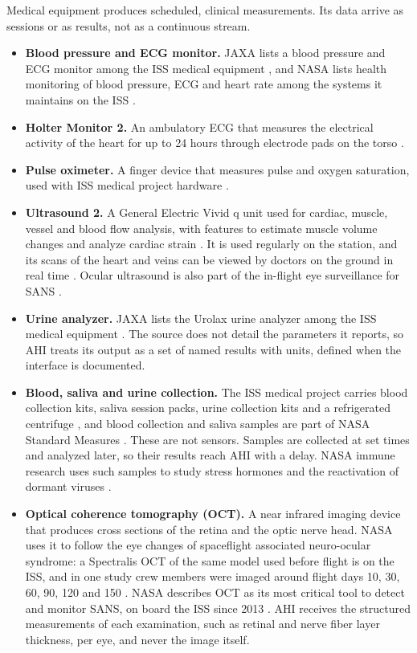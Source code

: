 Medical equipment produces scheduled, clinical measurements. Its data arrive as sessions or as results, not as a continuous stream.

\begin{itemize}
\item \textbf{Blood pressure and ECG monitor.} JAXA lists a blood pressure and ECG monitor among the ISS medical equipment \cite{jaxa_medops_system}, and NASA lists health monitoring of blood pressure, ECG and heart rate among the systems it maintains on the ISS \cite{nasa_jsc_exercise_countermeasures}.
\item \textbf{Holter Monitor 2.} An ambulatory ECG that measures the electrical activity of the heart for up to 24 hours through electrode pads on the torso \cite{nasa_issmp_hardware}.
\item \textbf{Pulse oximeter.} A finger device that measures pulse and oxygen saturation, used with ISS medical project hardware \cite{nasa_issmp_hardware}.
\item \textbf{Ultrasound 2.} A General Electric Vivid q unit used for cardiac, muscle, vessel and blood flow analysis, with features to estimate muscle volume changes and analyze cardiac strain \cite{nasa_issmp_hardware}. It is used regularly on the station, and its scans of the heart and veins can be viewed by doctors on the ground in real time \cite{nasa_ultrasound_2025}. Ocular ultrasound is also part of the in-flight eye surveillance for SANS \cite{brunstetter2023brief}.
\item \textbf{Urine analyzer.} JAXA lists the Urolax urine analyzer among the ISS medical equipment \cite{jaxa_medops_system}. The source does not detail the parameters it reports, so AHI treats its output as a set of named results with units, defined when the interface is documented.
\item \textbf{Blood, saliva and urine collection.} The ISS medical project carries blood collection kits, saliva session packs, urine collection kits and a refrigerated centrifuge \cite{nasa_issmp_hardware}, and blood collection and saliva samples are part of NASA Standard Measures \cite{nasa_standard_measures}. These are not sensors. Samples are collected at set times and analyzed later, so their results reach AHI with a delay. NASA immune research uses such samples to study stress hormones and the reactivation of dormant viruses \cite{nasa_immune_biomarkers}.
\item \textbf{Optical coherence tomography (OCT).} A near infrared imaging device that produces cross sections of the retina and the optic nerve head. NASA uses it to follow the eye changes of spaceflight associated neuro-ocular syndrome: a Spectralis OCT of the same model used before flight is on the ISS, and in one study crew members were imaged around flight days 10, 30, 60, 90, 120 and 150 \cite{macias2020ocular}. NASA describes OCT as its most critical tool to detect and monitor SANS, on board the ISS since 2013 \cite{brunstetter2023brief}. AHI receives the structured measurements of each examination, such as retinal and nerve fiber layer thickness, per eye, and never the image itself.

\end{itemize}
